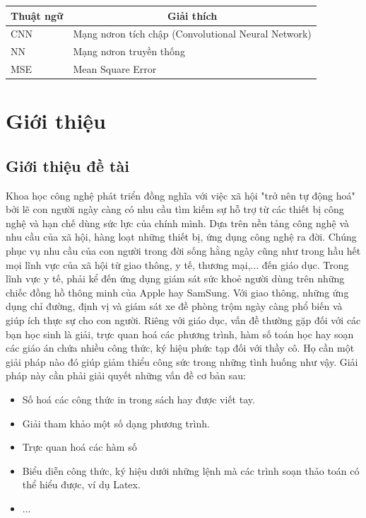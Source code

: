 \documentclass[a4paper,12pt]{article}
\begin{document}
	
	
	\begin{table} [!htb]
		\centering
		\begin{tabular}{| m{4cm} | m{12cm}|}\hline
			\multicolumn{1}{|c|}{\textbf{Thuật ngữ}} & 
			\multicolumn{1}{|c|}{\textbf{Giải thích}}\\\hline
			CNN & Mạng nơron tích chập (Convolutional Neural Network)\\\hline
			NN & Mạng nơron truyền thống \\\hline
			MSE & Mean Square Error\\\hline
		\end{tabular}
	\end{table}
	
	\newpage
	\section{Giới thiệu}
	\subsection{Giới thiệu đề tài}
	\label{subsec: introduce}
	Khoa học công nghệ phát triển đồng nghĩa với việc xã hội "trở nên tự động hoá" bởi lẽ con người ngày càng có nhu cầu tìm kiếm sự hỗ trợ từ các thiết bị công nghệ và hạn chế dùng sức lực của chính mình. Dựa trên nền tảng công nghệ và nhu cầu của xã hội, hàng loạt những thiết bị, ứng dụng công nghệ ra đời. Chúng phục vụ nhu cầu của con người trong đời sống hằng ngày cũng như trong hầu hết mọi lĩnh vực của xã hội từ giao thông, y tế, thương mại,... đến giáo dục. Trong lĩnh vực y tế, phải kể đến ứng dụng giám sát sức khoẻ người dùng trên những chiếc đồng hồ thông minh của Apple hay SamSung. Với giao thông, những ứng dụng chỉ đường, định vị và giám sát xe đề phòng trộm ngày càng phổ biến và giúp ích thực sự cho con người. Riêng với giáo dục, vấn đề thường gặp đối với các bạn học sinh là giải, trực quan hoá các phương trình, hàm số toán học hay soạn các giáo án chứa nhiều công thức, ký hiệu phức tạp đối với thầy cô. Họ cần một giải pháp nào đó giúp giảm thiểu công sức trong những tình huống như vậy. Giải pháp này cần phải giải quyết những vấn đề cơ bản sau:
	
	\begin{itemize}
		\item Số hoá các công thức in trong sách hay được viết tay.
		\item Giải tham khảo một số dạng phương trình.
		\item Trực quan hoá các hàm số
		\item Biểu diễn công thức, ký hiệu dưới những lệnh mà các trình soạn thảo toán có thể hiểu được, ví dụ Latex.
		\item ...
		
	\end{itemize}
	
\end{document}
